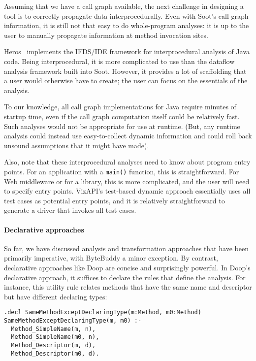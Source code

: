 Assuming that we have a call graph available, the next challenge in
designing a tool is to correctly propagate data interprocedurally.
Even with Soot's call graph information, it is still not that easy to
do whole-program analyses: it is up to the user to manually propagate
information at method invocation sites.

Heros~\cite{bodden12:_inter_proced_data_flow_analy} implements the
IFDS/IDE framework for interprocedural analysis of Java code. Being
interprocedural, it is more complicated to use than the dataflow analysis
framework built into Soot. However, it provides a lot of scaffolding
that a user would otherwise have to create; the user can focus on the
essentials of the analysis.

To our knowledge, all call graph implementations for Java require
minutes of startup time, even if the call graph computation itself
could be relatively fast. Such analyses would not be appropriate for
use at runtime. (But, any runtime analysis could instead use
easy-to-collect dynamic information and could roll back unsound
assumptions that it might have made).

Also, note that these interprocedural analyses need to know about
program entry points.  For an application with a \texttt{main()}
function, this is straightforward.  For Web middleware or for a
library, this is more complicated, and the user will need to specify
entry points. VizAPI's test-based dynamic approach essentially uses
all test cases as potential entry points, and it is relatively
straightforward to generate a driver that invokes all test cases.

\paragraph{Declarative approaches}
So far, we have discussed analysis and transformation approaches that have
been primarily imperative, with ByteBuddy a minor exception. By contrast,
declarative approaches like Doop are concise and surprisingly powerful.
In Doop's declarative approach, it suffices to declare the rules that
define the analysis. For instance, this utility rule relates methods
that have the same name and descriptor but have different declaring types:

\begin{lstlisting}
.decl SameMethodExceptDeclaringType(m:Method, m0:Method)
SameMethodExceptDeclaringType(m, m0) :-
  Method_SimpleName(m, n),
  Method_SimpleName(m0, n),
  Method_Descriptor(m, d),
  Method_Descriptor(m0, d).
\end{lstlisting}

